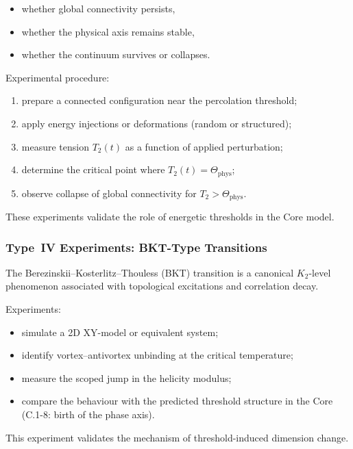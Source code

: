 \begin{itemize}
    \item whether global connectivity persists,
    \item whether the physical axis remains stable,
    \item whether the continuum survives or collapses.
\end{itemize}

Experimental procedure:

\begin{enumerate}
    \item prepare a connected configuration near the percolation threshold;
    \item apply energy injections or deformations (random or structured);
    \item measure tension $T_2(t)$ as a function of applied perturbation;
    \item determine the critical point where $T_2(t) = \Theta_{\mathrm{phys}}$;
    \item observe collapse of global connectivity for $T_2 > \Theta_{\mathrm{phys}}$.
\end{enumerate}

These experiments validate the role of energetic thresholds in the Core model.



\subsubsection{Type~IV Experiments: BKT-Type Transitions}

The Berezinskii–Kosterlitz–Thouless (BKT) transition is a canonical
$K_2$-level phenomenon associated with topological excitations and
correlation decay.

Experiments:

\begin{itemize}
    \item simulate a 2D XY-model or equivalent system;
    \item identify vortex–antivortex unbinding at the critical temperature;
    \item measure the scoped jump in the helicity modulus;
    \item compare the behaviour with the predicted threshold structure in
          the Core (C.1-8: birth of the phase axis).
\end{itemize}

This experiment validates the mechanism of threshold-induced dimension change.



